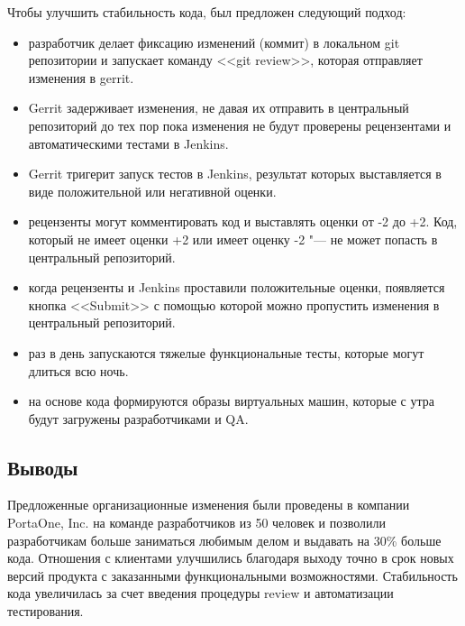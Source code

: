 \documentclass[10pt, a5paper]{article}
\begin{document}
Чтобы улучшить стабильность кода, был предложен следующий подход:

\begin{itemize}
  \item разработчик делает фиксацию изменений (коммит) в локальном git репозитории и запускает команду <<git review>>, которая отправляет изменения в gerrit.
  \item Gerrit задерживает изменения, не давая их отправить в центральный репозиторий до тех пор пока изменения не будут проверены рецензентами и автоматическими тестами в Jenkins.
  \item Gerrit тригерит запуск тестов в Jenkins, результат которых выставляется в виде положительной или негативной оценки.
  \item рецензенты могут комментировать код и выставлять оценки от -2 до +2. Код, который не имеет оценки +2 или имеет оценку -2 "--- не может попасть в центральный репозиторий.
  \item когда рецензенты и Jenkins проставили положительные оценки, появляется кнопка <<Submit>> с помощью которой можно пропустить изменения в центральный репозиторий.
  \item раз в день запускаются тяжелые функциональные тесты, которые могут длиться всю ночь.
  \item на основе кода формируются образы виртуальных машин, которые с утра будут загружены разработчиками и QA.
\end{itemize}

\subsection*{Выводы}

Предложенные организационные изменения были проведены в компании PortaOne, Inc. на команде разработчиков из 50 человек и позволили разработчикам больше заниматься любимым делом и выдавать на 30\% больше кода. Отношения с клиентами улучшились благодаря выходу точно в срок новых версий продукта с заказанными функциональными возможностями. Стабильность кода увеличилась за счет введения процедуры review и автоматизации тестирования.
\end{document}
